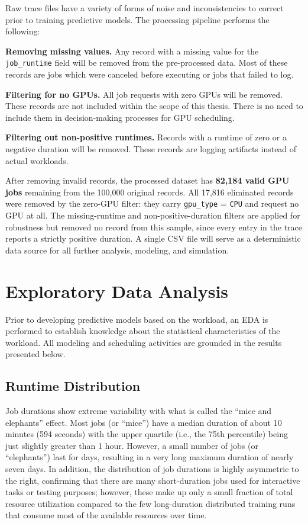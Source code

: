 Raw trace files have a variety of forms of noise and inconsistencies to correct prior to training predictive models. The processing pipeline performs the following:

\textbf{Removing missing values.} Any record with a missing value for the \texttt{job\_runtime} field will be removed from the pre-processed data. Most of these records are jobs which were canceled before executing or jobs that failed to log.

\textbf{Filtering for no GPUs.} All job requests with zero GPUs will be removed. These records are not included within the scope of this thesis. There is no need to include them in decision-making processes for GPU scheduling.

\textbf{Filtering out non-positive runtimes.} Records with a runtime of zero or a negative duration will be removed. These records are logging artifacts instead of actual workloads.

After removing invalid records, the processed dataset has \textbf{82,184 valid GPU jobs} remaining from the 100,000 original records. All 17,816 eliminated records were removed by the zero-GPU filter: they carry \texttt{gpu\_type} = \texttt{CPU} and request no GPU at all. The missing-runtime and non-positive-duration filters are applied for robustness but removed no record from this sample, since every entry in the trace reports a strictly positive duration. A single CSV file will serve as a deterministic data source for all further analysis, modeling, and simulation.

\section{Exploratory Data Analysis}

Prior to developing predictive models based on the workload, an EDA is performed to establish knowledge about the statistical characteristics of the workload. All modeling and scheduling activities are grounded in the results presented below.

\subsection{Runtime Distribution}

Job durations show extreme variability with what is called the ``mice and elephants'' effect. Most jobs (or ``mice'') have a median duration of about 10 minutes (594 seconds) with the upper quartile (i.e., the 75th percentile) being just slightly greater than 1 hour. However, a small number of jobs (or ``elephants'') last for days, resulting in a very long maximum duration of nearly seven days. In addition, the distribution of job durations is highly asymmetric to the right, confirming that there are many short-duration jobs used for interactive tasks or testing purposes; however, these make up only a small fraction of total resource utilization compared to the few long-duration distributed training runs that consume most of the available resources over time.

